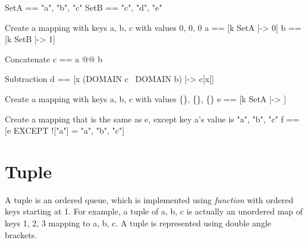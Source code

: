 \begin{tla}
SetA == {"a", "b", "c"}
SetB == {"c", "d", "e"}

\* Create a mapping with keys a, b, c with values 0, 0, 0
a == [k \in SetA |-> 0]
b == [k \in SetB |-> 1]

\* Concatenate 
c == a @@ b

\* Subtraction
d == [x \in (DOMAIN c \ DOMAIN b) |-> c[x]]

\* Create a mapping with keys a, b, c with values \{\}, \{\}, \{\}
e == [k \in SetA |-> {}]

\* Create a mapping that is the same as e, except key a's value is {"a", "b", "c"}
f == [e EXCEPT !["a"] = {"a", "b", "c"}] 

\end{tla}
\begin{tlatex}
%
%
\@pvspace{8.0pt}%
\@x{}%
%
\@xx{}%
%
%
\@pvspace{8.0pt}%
\@x{}%
%
\@xx{}%
%
\@pvspace{8.0pt}%
\@x{}%
%
\@xx{}%
\@pvspace{8.0pt}%
\@x{}%
%
\@xx{}%
%
\@pvspace{8.0pt}%
\@x{}%
%
\@xx{}%
\@pvspace{8.0pt}%
\end{tlatex}

\section{Tuple}

A tuple is an ordered queue, which is implemented using \textit{function} with
ordered keys starting at 1. For example, a tuple of a, b, c is actually an
unordered map of keys 1, 2, 3 mapping to a, b, c. A tuple is represented using 
double angle brackets.\\

